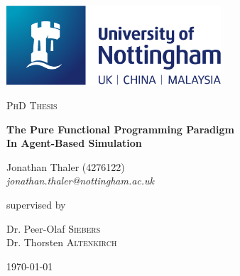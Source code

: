 \documentclass[oneside]{book}
\begin{document}
\begin{titlepage}
	\centering
	\includegraphics[width=0.60\textwidth]{./logo/UoN_Primary_Logo_RGB.png}\par\vspace{1cm}
	{\scshape\Large PhD Thesis\par}
	\vspace{1.5cm}
	{\huge\bfseries The Pure Functional Programming Paradigm \\ In Agent-Based Simulation \par}
	\vspace{2cm}
	{\Large Jonathan Thaler (4276122) \\ \itshape jonathan.thaler@nottingham.ac.uk \par}
	\vfill
	supervised by\par
	Dr. Peer-Olaf \textsc{Siebers} \\
	Dr. Thorsten \textsc{Altenkirch}

	\vfill

	{\large \today\par}
\end{titlepage}

\cleardoublepage
\end{document}
